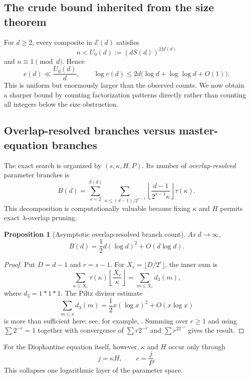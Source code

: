 \documentclass[11pt]{article}
\newtheorem{proposition}[theorem]{Proposition}
\newcommand{\Eset}{\mathcal E}
\begin{document}
\subsection{The crude bound inherited from the size theorem}

For $d\ge2$, every composite in $\Eset(d)$ satisfies
\[
n<U_0(d):=(dS(d))^{2M(d)}
\]
and $n\equiv1\pmod d$.  Hence
\[
e(d)\ll\frac{U_0(d)}d,
\qquad
\log e(d)\le
2d\bigl(\log d+\log\log d+O(1)\bigr).
\]
This is uniform but enormously larger than the observed counts.  We now
obtain a sharper bound by counting factorization patterns directly rather
than counting all integers below the size obstruction.

\subsection{Overlap-resolved branches versus master-equation branches}

The exact search is organized by $(s,\kappa,H,P)$.  Its number of
\emph{overlap-resolved} parameter branches is
\[
B(d)=
\sum_{s=2}^{S(d)}
\sum_{\kappa\le(d-1)/2^{s-1}}
\left\lfloor\frac{d-1}{2^{s-1}\kappa}\right\rfloor\tau(\kappa).
\]
This decomposition is computationally valuable because fixing $\kappa$ and
$H$ permits exact $\lambda$-overlap pruning.

\begin{proposition}[Asymptotic overlap-resolved branch count]
\label{prop:branch-asymptotic}
As $d\to\infty$,
\[
\boxed{
B(d)=\frac12d(\log d)^2+O(d\log d).
}
\]
\end{proposition}

\begin{proof}
Put $D=d-1$ and $r=s-1$.  For
$X_r=\lfloor D/2^r\rfloor$, the inner sum is
\[
\sum_{\kappa\le X_r}\tau(\kappa)
\left\lfloor\frac{X_r}{\kappa}\right\rfloor
=
\sum_{m\le X_r}d_3(m),
\]
where $d_3=1*1*1$.  The Piltz divisor estimate
\[
\sum_{m\le x}d_3(m)
=\frac12x(\log x)^2+O(x\log x)
\]
is more than sufficient here; see, for example,
\cite[Chapter~1]{IwaniecKowalski2004}.  Summing over $r\ge1$ and using
$\sum2^{-r}=1$ together with convergence of
$\sum r2^{-r}$ and $\sum r^22^{-r}$ gives the result.
\end{proof}

For the Diophantine equation itself, however, $\kappa$ and $H$ occur only
through
\[
j=\kappa H,
\qquad
c=\frac jP.
\]
This collapses one logarithmic layer of the parameter space.
\end{document}
